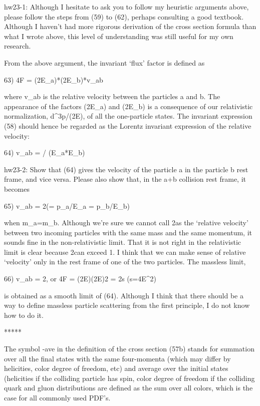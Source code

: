 \documentclass[12pt]{article}
\begin{document}
hw23-1:  Although I hesitate to ask you to follow my heuristic arguments
  above, please follow the steps from (59) to (62), perhaps consulting
  a good textbook.  Although I haven't had more rigorous derivation of
  the cross section formula than what I wrote above, this level of
  understanding was still useful for my own research.

  From the above argument, the invariant `flux' factor is defined as

  63) 4F = (2E_a)*(2E_b)*v_{ab}

  where v_{ab} is the relative velocity between the particles a and b.
  The appearance of the factors (2E_a) and (2E_b) is a consequence
  of our relativistic normalization, d^3p/(2E), of all the one-particle
  states.  The invariant expression (58) should hence be regarded as
  the Lorentz invariant expression of the relative velocity:

  64) v_{ab} =  / (E_a*E_b)

hw23-2:  Show that (64) gives the velocity of the particle a in the
  particle b rest frame, and vice versa.  Please also show that, in the
  a+b collision rest frame, it becomes

  65) v_{ab} = 2\beta   (\beta = p_a/E_a = p_b/E_b)

  when m_a=m_b.  Although we're sure we cannot call 2\beta as the
  `relative velocity' between two incoming particles with the same mass
  and the same momentum, it sounds fine in the non-relativistic limit.
  That it is not right in the relativistic limit is clear because
  2\beta can exceed 1.  I think that we can make sense of relative
  `velocity' only in the rest frame of one of the two particles.
  The massless limit,

  66) v_{ab} = 2, or 4F = (2E)(2E)2 = 2s   (s=4E^2)

  is obtained as a smooth limit of (64).  Although I think that there
  should be a way to define massless particle scattering from the first
  principle, I do not know how to do it.

                                 *****

  The symbol \Sum-ave in the definition of the cross section (57b) stands
  for summation over all the final states with the same four-momenta
  (which may differ by helicities, color degree of freedom, etc) and
  average over the initial states (helicities if the colliding particle
  has spin, color degree of freedom if the colliding quark and gluon
  distributions are defined as the sum over all colors, which is the
  case for all commonly used PDF's.
\end{document}
